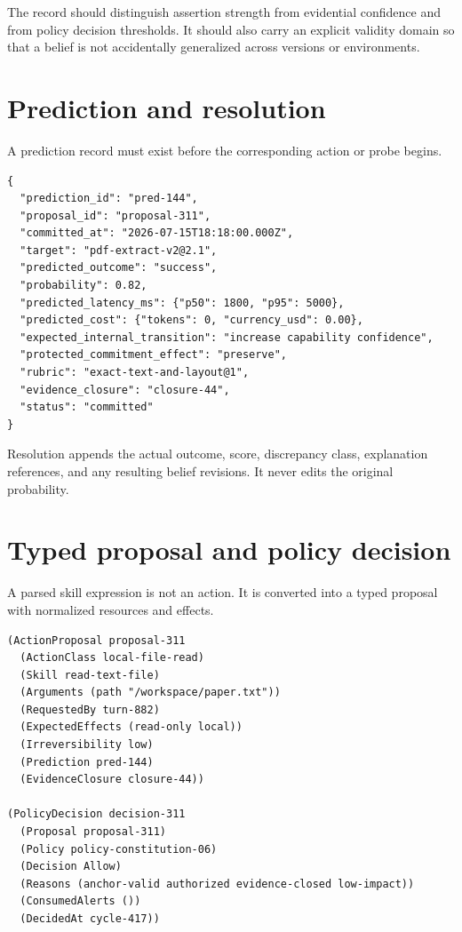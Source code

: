 \documentclass[11pt,oneside]{report}
\begin{document}
The record should distinguish assertion strength from evidential confidence and from policy decision thresholds. It should also carry an explicit validity domain so that a belief is not accidentally generalized across versions or environments.

\section{Prediction and resolution}

A prediction record must exist before the corresponding action or probe begins.

\begin{lstlisting}[caption={Prediction contract}]
{
  "prediction_id": "pred-144",
  "proposal_id": "proposal-311",
  "committed_at": "2026-07-15T18:18:00.000Z",
  "target": "pdf-extract-v2@2.1",
  "predicted_outcome": "success",
  "probability": 0.82,
  "predicted_latency_ms": {"p50": 1800, "p95": 5000},
  "predicted_cost": {"tokens": 0, "currency_usd": 0.00},
  "expected_internal_transition": "increase capability confidence",
  "protected_commitment_effect": "preserve",
  "rubric": "exact-text-and-layout@1",
  "evidence_closure": "closure-44",
  "status": "committed"
}
\end{lstlisting}

Resolution appends the actual outcome, score, discrepancy class, explanation references, and any resulting belief revisions. It never edits the original probability.

\section{Typed proposal and policy decision}

A parsed skill expression is not an action. It is converted into a typed proposal with normalized resources and effects.

\begin{lstlisting}[language=Metta,caption={Typed action proposal and policy decision}]
(ActionProposal proposal-311
  (ActionClass local-file-read)
  (Skill read-text-file)
  (Arguments (path "/workspace/paper.txt"))
  (RequestedBy turn-882)
  (ExpectedEffects (read-only local))
  (Irreversibility low)
  (Prediction pred-144)
  (EvidenceClosure closure-44))

(PolicyDecision decision-311
  (Proposal proposal-311)
  (Policy policy-constitution-06)
  (Decision Allow)
  (Reasons (anchor-valid authorized evidence-closed low-impact))
  (ConsumedAlerts ())
  (DecidedAt cycle-417))
\end{lstlisting}
\end{document}
